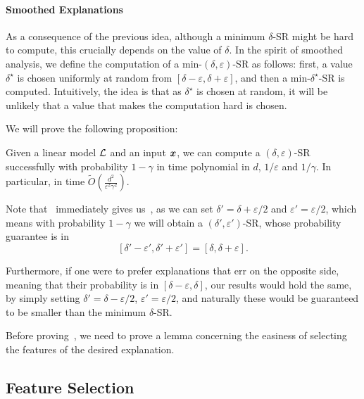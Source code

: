  \paragraph{Smoothed Explanations} As a consequence of the previous idea, although a minimum $\delta$-SR might be hard to compute, this crucially depends on the value of $\delta$. In the spirit of smoothed analysis, we define the computation of a min-$(\delta, \varepsilon)$-SR as follows: first, a value $\delta^\star$ is chosen uniformly at random from $[\delta-\varepsilon, \delta+\varepsilon]$, and then a min-$\delta^\star$-SR is computed. Intuitively, the idea is that as $\delta^\star$ is chosen at random, it will be unlikely that a value that makes the computation hard is chosen. 

 We will prove the following proposition:

\begin{proposition}
    \label{prop:smoothed-explanation}
    Given a linear model $\mathcal{L}$ and an input ${\bm{x}}$, we can compute a $(\delta, \varepsilon)$-SR successfully with probability $1 - \gamma$ in time polynomial in $d$, $1/\varepsilon$ and $1/\gamma$. In particular, in time $\tilde{O}\left( \frac{d^2}{\varepsilon^2\gamma^2}\right)$.
\end{proposition}

Note that~ immediately gives us~, as we can set $\delta' =  \delta+\varepsilon/2$ and $\varepsilon' = \varepsilon/2$, which means with probability $1 - \gamma$ we will obtain a $(\delta', \varepsilon')$-SR, whose probability guarantee is in 
\[
  [\delta' - \varepsilon', \delta' + \varepsilon'] =  [\delta, \delta + \varepsilon].
\]

Furthermore, if one were to prefer explanations that err on the opposite side, meaning that their probability is in $[\delta - \varepsilon, \delta]$, our results would hold the same, by simply setting $\delta' = \delta - \varepsilon/2$, $\varepsilon' = \varepsilon/2$, and naturally these would be guaranteed to be smaller than the minimum $\delta$-SR.

Before proving~, we need to prove a lemma concerning the easiness of selecting the features of the desired explanation.

\subsection{Feature Selection}

